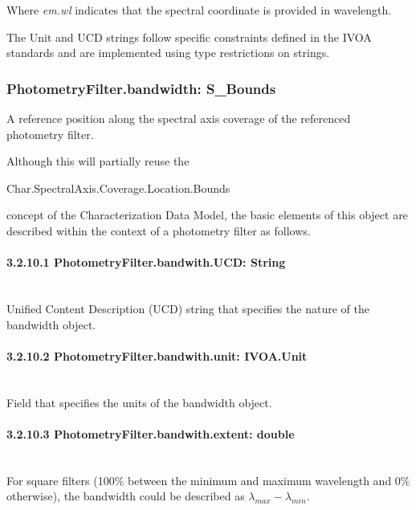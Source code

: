 \documentclass[11pt,a4paper]{ivoa}
\begin{document}
Where \textit{em.wl }indicates that the spectral coordinate is provided in wavelength.
\par

The Unit and UCD strings follow specific constraints defined in the IVOA standards and are implemented using type restrictions on strings.
\par

\subsubsection{PhotometryFilter.bandwidth: S\_Bounds}
A reference position along the spectral axis coverage of the referenced photometry filter.
\par

Although this will partially reuse the
\par

\begin{center}
Char.SpectralAxis.Coverage.Location.Bounds
\end{center}\par

concept of the Characterization Data Model, the basic elements of this object are described within the context of a photometry filter as follows.
\par

\paragraph{3.2.10.1
PhotometryFilter.bandwith.UCD: String} \hspace{0pt} \\
Unified Content Description (UCD) string that specifies the nature of the bandwidth object.
\par

\paragraph{3.2.10.2
PhotometryFilter.bandwith.unit: IVOA.Unit} \hspace{0pt} \\
Field that specifies the units of the bandwidth object.
\par

\paragraph{3.2.10.3
PhotometryFilter.bandwith.extent: double} \hspace{0pt} \\
For square filters (100$\%$  between the minimum and maximum wavelength and 0$\%$  otherwise), the bandwidth could be described as $\lambda_{max} - \lambda_{min}$.
\par
\end{document}
